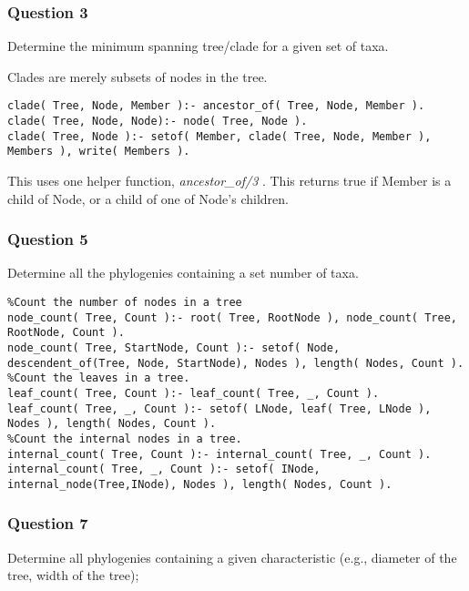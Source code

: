\documentclass[10pt]{article}
\begin{document}
\subsubsection{Question 3}
Determine the minimum spanning tree/clade for a given set of taxa.

Clades are merely subsets of nodes in the tree.

\begin{verbatim}
clade( Tree, Node, Member ):- ancestor_of( Tree, Node, Member ).
clade( Tree, Node, Node):- node( Tree, Node ).
clade( Tree, Node ):- setof( Member, clade( Tree, Node, Member ), Members ), write( Members ).
\end{verbatim}

This uses one helper function, \emph{ ancestor\_of/3 }.  This returns true if Member is a child of Node, or a child of one of Node's children.

\subsubsection{Question 5}
 Determine all the phylogenies containing a set number of taxa.

\begin{verbatim}
%Count the number of nodes in a tree
node_count( Tree, Count ):- root( Tree, RootNode ), node_count( Tree, RootNode, Count ).
node_count( Tree, StartNode, Count ):- setof( Node, descendent_of(Tree, Node, StartNode), Nodes ), length( Nodes, Count ).
%Count the leaves in a tree.
leaf_count( Tree, Count ):- leaf_count( Tree, _, Count ).
leaf_count( Tree, _, Count ):- setof( LNode, leaf( Tree, LNode ), Nodes ), length( Nodes, Count ).
%Count the internal nodes in a tree.
internal_count( Tree, Count ):- internal_count( Tree, _, Count ).
internal_count( Tree, _, Count ):- setof( INode, internal_node(Tree,INode), Nodes ), length( Nodes, Count ).
\end{verbatim}

\subsubsection{Question 7}
Determine all phylogenies containing a given characteristic (e.g., diameter of the tree, width of the tree);
\end{document}
